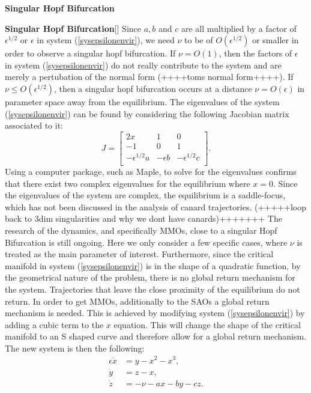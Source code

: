 \begin{theorem}
\begin{theorem}
\begin{theorem}
\begin{definition}{\textbf{Singular Hopf Bifurcation} \citealp{strogatz2007nonlinear}}
\begin{definition}{\textbf{Singular Hopf Bifurcation}}[\citealp{strogatz2007nonlinear}]
Since $a, b$ and $c$ are all multiplied by a factor of $\epsilon^{1/2}$ or $\epsilon$ in system (\ref{sysepsilonenvir}), we need $\nu$ to be of $O(\epsilon^{1/2})$ or smaller in order to observe a singular hopf bifurcation.
If $\nu=O(1)$, then the factors of $\epsilon$ in system (\ref{sysepsilonenvir}) do not really contribute to the system and are merely a pertubation of the normal form (++++toms normal form++++).
If $\nu \leq O(\epsilon^{1/2})$, then a singular hopf bifurcation occurs at a distance $\nu =O(\epsilon)$ in parameter space away from the equilibrium.
The eigenvalues of the system (\ref{sysepsilonenvir}) can be found by considering the following Jacobian matrix associated to it:
\begin{equation}
J=\begin{bmatrix}
2x & 1 & 0 \\
-1 & 0 & 1 \\
-\epsilon^{1/2} a & - \epsilon b & - \epsilon^{1/2} c\\
\end{bmatrix}.
\end{equation}
Using a computer package, such as Maple, to solve for the eigenvalues confirms that there exist two complex eigenvalues for the equilibrium where $x=0$.
Since the eigenvalues of the system are complex, the equilibrium is a saddle-focus, which has not been discussed in the analysis of canard trajectories. (+++++loop back to 3dim singularities and why we dont have canards)+++++++
The research of the dynamics, and specifically MMOs, close to a singular Hopf Bifurcation is still ongoing. Here we only consider a few specific cases, where $\nu$ is treated as the main parameter of interest. Furthermore, since the critical manifold in system (\ref{sysepsilonenvir}) is in the shape of a quadratic function, by the geometrical nature of the problem, there is no global return mechanism for the system. Trajectories that leave the close proximity of the equilibrium do not return. In order to get MMOs, additionally to the SAOs a global return mechanism is needed.
This is achieved by modifying system (\ref{sysepsilonenvir}) by adding a cubic term to the $x$ equation. This will change the shape of the critical manifold to an S shaped curve and therefore allow for a global return mechanism. The new system is then the following:
\begin{align*}
\epsilon \dot{x} &= y - x^2 - x^3, \\
\dot{y} &= z - x, \\
\dot{z} &= -\nu -ax -by -cz.
\end{align*}


\end{definition}
\end{definition}
\end{theorem}
\end{theorem}
\end{theorem}
